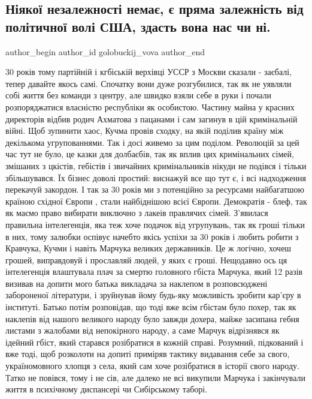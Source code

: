  
 
 
 
 
 
\subsection{Ніякої незалежності немає, є пряма залежність від політичної волі США, здасть вона нас чи ні.}
\label{sec:24_08_2021.fb.golobuckij_vova.1.nezalezhnist}
 
\ifcmt
 author_begin
   author_id golobuckij_vova
 author_end
\fi

30 років тому партійній і кгбіській верхівці  УССР з Москви сказали - заєбалі,
тепер давайте якось самі. Спочатку вони дуже розгубилися, так як не уявляли
собі життя без команди з центру, але швидко взяли себе в руки і почали
розпоряджатися власністю республіки як особистою. Частину майна у красних
директорів відбив родич Ахматова з пацанами і сам загинув в цій кримінальній
війні. Щоб зупинити хаос, Кучма провів сходку, на якій поділив країну між
декількома угрупованнями. Так і досі живемо за цим поділом. Революцій за цей
час  тут не було, це казки для долбаєбів, так як вплив цих  кримінальних сімей,
змішаних з цкістів, гебістів і звичайних кримінальників нікуди не подівся і
тільки збільшувався. Їх бізнес доволі простий: виснажуй все що тут є, і всі
надходження перекачуй закордон. І так за 30 років ми з потенційно за ресурсами
найбагатшою країною східної  Європи , стали найбіднішою всієї Європи.
Демократія - блеф, так як маємо право вибирати виключно з лакеів правлячих
сімей. З'явилася правильна інтелегенція, яка теж хоче подачок від угрупувань,
так як гроші тільки в них, тому залюбки оспівує начебто якісь успіхи за 30
років і любить робити з Кравчука, Кучми і навіть Марчука великих державників.
Це ж логічно, хочеш грошей, виправдовуй і прославляй людей, у яких є гроші.
Нещодавно ось ця інтелегенція влаштувала плач за смертю головного гбіста
Марчука, який 12 разів визивав на допити мого батька викладача за наклепом в
розповсюджені забороненої літератури, і зруйнував йому будь-яку можливість
зробити кар'єру в інституті. Батько потім розповідав, що тоді вже всім гбістам
було похер, так як наклепів від нашого великого народу було завжди дохера,
майже засипана гебня листами з жалобами від непокірного народу, а саме Марчук
відрізнявся як ідейний гбіст,  який  старався розібратися в кожній справі.
Розумний, підкований і вже тоді, щоб розколоти на допиті приміряв тактику
видавання себе за свого, україномовного хлопця з села, який сам хоче
розібратися в історії свого народу. Татко не повівся, тому і не сів, але далеко
не всі викупили Марчука і закінчували життя в психічному диспансері чи
Сибірському таборі. 

